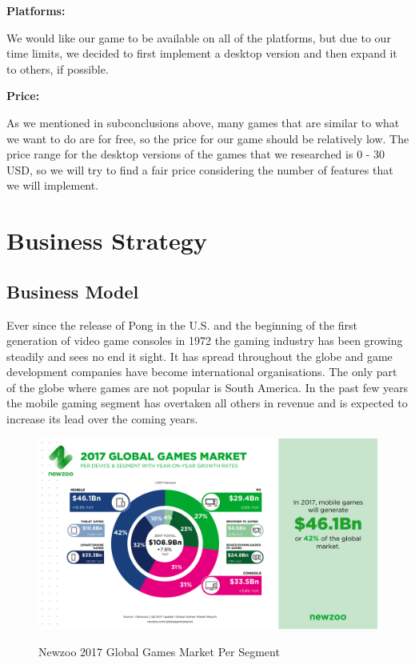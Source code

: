 \documentclass[12p]{article}
\begin{document}
\textbf{Platforms:}

We would like our game to be available on all of the platforms, but due to our time limits, we decided to first implement a desktop version and then expand it to others, if possible.

\textbf{Price:}

As we mentioned in subconclusions above, many games that are similar to what we want to do are for free, so the price for our game should be relatively low. The price range for the desktop versions of the games that we researched is 0 - 30 USD, so we will try to find a fair price considering the number of features that we will implement.


\newpage
\section{Business Strategy} \label{MarketAnalysis}

\subsection{Business Model} 
Ever since the release of Pong\cite{Pong} in the U.S. and the beginning of the first generation of video game consoles in 1972 the gaming industry has been growing steadily and sees no end it sight. It has spread throughout the globe and game development companies have become international organisations. The only part of the globe where games are not popular is South America.\cite{GamesMarketRevenue} In the past few years the mobile gaming segment has overtaken all others in revenue and is expected to increase its lead over the coming years.

\begin{figure}[ht]
  \center
  \includegraphics[width=1\textwidth]{BusinessStrategy/Newzoo_2017_Global_Games_Market_Per_Segment_April_2017}
  \label{Newzoo_2017_Global_Games_Market_Per_Segment_April_2017}
  \caption{Newzoo 2017 Global Games Market Per Segment \cite{NezooScreenshot}}
\end{figure}
\end{document}
